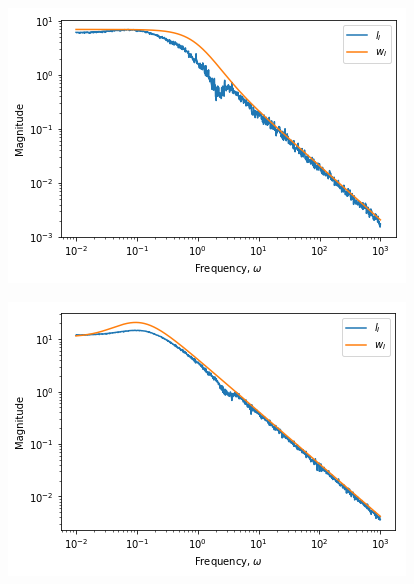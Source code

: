 \begin{figure}[H]
	\centering
	\begin{minipage}{.48\textwidth}
		\centering
		\includegraphics[width=\linewidth]{Figures/Uncertainty_wI_Gd12}
		\label{fig:Uncertainty wI Gd12}
	\end{minipage}%
	\hfill
	\begin{minipage}{.48\textwidth}
		\centering
		\includegraphics[width=\linewidth]{Figures/Uncertainty_wI_Gd22}
		\label{fig:Uncertainty wI Gd22}
	\end{minipage}
\end{figure}